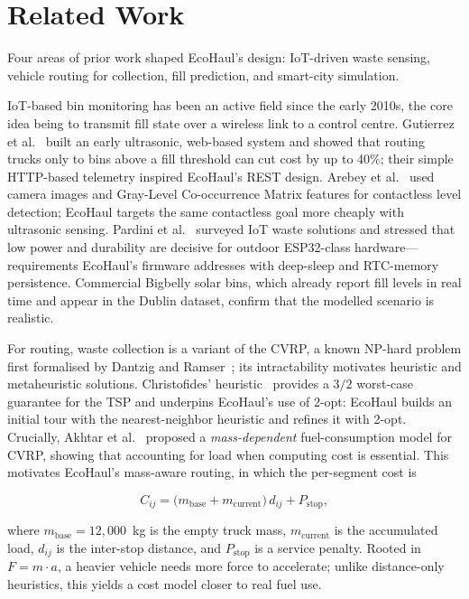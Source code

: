 \documentclass[conference, a4paper]{IEEEtran}
\begin{document}
\section{Related Work}
Four areas of prior work shaped EcoHaul's design: IoT-driven waste sensing, vehicle routing for collection, fill prediction, and smart-city simulation.

IoT-based bin monitoring has been an active field since the early 2010s, the core idea being to transmit fill state over a wireless link to a control centre. Gutierrez et al.~\cite{gutierrez2015} built an early ultrasonic, web-based system and showed that routing trucks only to bins above a fill threshold can cut cost by up to 40\%; their simple HTTP-based telemetry inspired EcoHaul's REST design. Arebey et al.~\cite{arebey2012} used camera images and Gray-Level Co-occurrence Matrix features for contactless level detection; EcoHaul targets the same contactless goal more cheaply with ultrasonic sensing. Pardini et al.~\cite{pardini2018} surveyed IoT waste solutions and stressed that low power and durability are decisive for outdoor ESP32-class hardware---requirements EcoHaul's firmware addresses with deep-sleep and RTC-memory persistence. Commercial Bigbelly solar bins, which already report fill levels in real time and appear in the Dublin dataset, confirm that the modelled scenario is realistic.

For routing, waste collection is a variant of the CVRP, a known NP-hard problem first formalised by Dantzig and Ramser~\cite{dantzig1959}; its intractability motivates heuristic and metaheuristic solutions. Christofides' heuristic~\cite{christofides1976} provides a $3/2$ worst-case guarantee for the TSP and underpins EcoHaul's use of 2-opt: EcoHaul builds an initial tour with the nearest-neighbor heuristic and refines it with 2-opt. Crucially, Akhtar et al.~\cite{akhtar2017} proposed a \textit{mass-dependent} fuel-consumption model for CVRP, showing that accounting for load when computing cost is essential. This motivates EcoHaul's mass-aware routing, in which the per-segment cost is

\begin{equation}
  C_{ij} = \bigl(m_{\text{base}} + m_{\text{current}}\bigr)\, d_{ij} + P_{\text{stop}},
  \label{eq:mass_aware}
\end{equation}

where $m_{\text{base}}=12{,}000$~kg is the empty truck mass, $m_{\text{current}}$ is the accumulated load, $d_{ij}$ is the inter-stop distance, and $P_{\text{stop}}$ is a service penalty. Rooted in $F=m\cdot a$, a heavier vehicle needs more force to accelerate; unlike distance-only heuristics, this yields a cost model closer to real fuel use.
\end{document}
